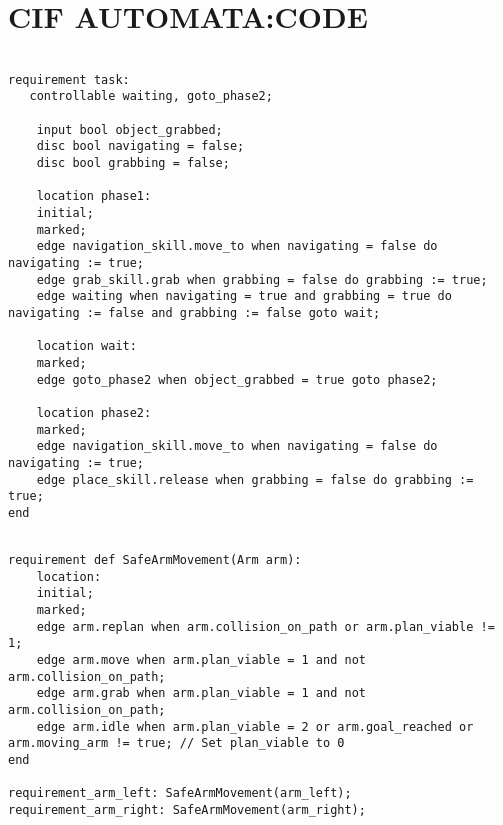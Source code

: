 \section{CIF AUTOMATA:\@ CODE}\label{sec:code}

\begin{center}
\begin{minipage}{0.95\columnwidth}
\begin{lstlisting}[caption=CIF model of pick-up task requirement, label=code:pick_task, language=CIF]%, linewidth=0.8\columnwidt

requirement task:
   controllable waiting, goto_phase2;

    input bool object_grabbed;
    disc bool navigating = false;
    disc bool grabbing = false;

    location phase1:
    initial;
    marked;
    edge navigation_skill.move_to when navigating = false do navigating := true;
    edge grab_skill.grab when grabbing = false do grabbing := true;
    edge waiting when navigating = true and grabbing = true do navigating := false and grabbing := false goto wait;

    location wait:
    marked;
    edge goto_phase2 when object_grabbed = true goto phase2;

    location phase2:
    marked;
    edge navigation_skill.move_to when navigating = false do navigating := true;
    edge place_skill.release when grabbing = false do grabbing := true;
end
\end{lstlisting}
\end{minipage}
\end{center}


\begin{center}
\begin{minipage}{0.95\columnwidth}
\begin{lstlisting}[caption=CIF model of safety requirement arms, label=code:safeArmCIF, language=CIF]%, linewidth=0.8\columnwidt

requirement def SafeArmMovement(Arm arm):
    location:
    initial;
    marked;
    edge arm.replan when arm.collision_on_path or arm.plan_viable != 1;
    edge arm.move when arm.plan_viable = 1 and not arm.collision_on_path;
    edge arm.grab when arm.plan_viable = 1 and not arm.collision_on_path;
    edge arm.idle when arm.plan_viable = 2 or arm.goal_reached or arm.moving_arm != true; // Set plan_viable to 0
end

requirement_arm_left: SafeArmMovement(arm_left);
requirement_arm_right: SafeArmMovement(arm_right);

\end{lstlisting}
\end{minipage}
\end{center}

